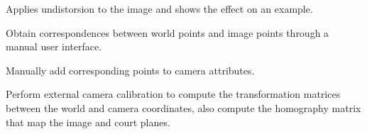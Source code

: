 \documentclass[letterpaper,10pt,english]{sphinxmanual}
\begin{document}
\begin{fulllineitems}
\begin{fulllineitems}
\end{fulllineitems}


\begin{fulllineitems}
\label{\detokenize{CameraUtils:CameraUtils.Camera.TestUndistorsion}}
\pysigstartsignatures
{}
\pysigstopsignatures
\sphinxAtStartPar
Applies undistorsion to the image and shows the effect on an example.

\end{fulllineitems}


\begin{fulllineitems}
\label{\detokenize{CameraUtils:CameraUtils.Camera.GetCorrespondences}}
\pysigstartsignatures
{}
\pysigstopsignatures
\sphinxAtStartPar
Obtain correspondences between world points and image points through
a manual user interface.

\end{fulllineitems}


\begin{fulllineitems}
\label{\detokenize{CameraUtils:CameraUtils.Camera.AddManualCorrespondences}}
\pysigstartsignatures
{}
\pysigstopsignatures
\sphinxAtStartPar
Manually add corresponding points to camera attributes.

\end{fulllineitems}


\begin{fulllineitems}
\label{\detokenize{CameraUtils:CameraUtils.Camera.ExtCalibration}}
\pysigstartsignatures
{}
\pysigstopsignatures
\sphinxAtStartPar
Perform external camera calibration to compute the transformation matrices
between the world and camera coordinates, also compute the homography
matrix that map the image and court planes.


\end{fulllineitems}
\end{fulllineitems}
\end{document}
